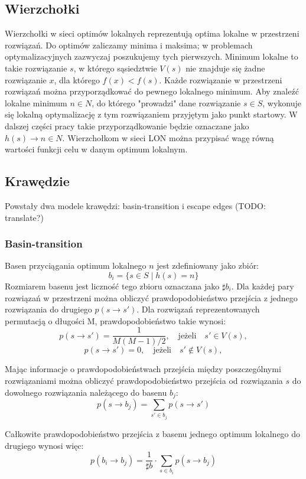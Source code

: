 \subsection*{Wierzchołki}
Wierzchołki w sieci optimów lokalnych reprezentują optima lokalne w przestrzeni rozwiązań.
Do optimów zaliczamy minima i maksima; w problemach optymalizacyjnych zazwyczaj poszukujemy tych pierwszych.
Minimum lokalne to takie rozwiązanie $s$, w którego sąsiedztwie $V(s)$ nie znajduje się żadne rozwiązanie $x$, dla którego $f(x) < f(s)$.
Każde rozwiązanie w przestrzeni rozwiązań można przyporządkować do pewnego lokalnego minimum.
Aby znaleźć lokalne minimum $n \in{N}$, do którego "prowadzi" dane rozwiązanie $s\in{S}$, wykonuje się lokalną optymalizację
z tym rozwiązaniem przyjętym jako punkt startowy.
W dalszej części pracy takie przyporządkowanie będzie oznaczane jako $h(s) \rightarrow n\in{N}$.
Wierzchołkom w sieci LON można przypisać wagę równą wartości funkcji celu w danym optimum lokalnym.

\subsection*{Krawędzie}

Powstały dwa modele krawędzi: basin-transition i escape edges (TODO: translate?)

\subsubsection{Basin-transition}
Basen przyciągania optimum lokalnego $n$ jest zdefiniowany jako zbiór:
$$b_i = \{s\in{S} \mid h(s) = n\}$$
Rozmiarem basenu jest liczność tego zbioru oznaczana jako $\sharp b_i$.
Dla każdej pary rozwiązań w przestrzeni można obliczyć prawdopodobieństwo przejścia z jednego rozwiązania do drugiego $p(s \rightarrow s')$.
Dla rozwiązań reprezentowanych permutacją o długości M, prawdopodobieństwo takie wynosi:
$$p(s \rightarrow s') = \frac{1}{M(M-1)/2}, \quad \text{jeżeli} \quad s'\in{V(s)},$$
$$p(s \rightarrow s') = 0, \quad \text{jeżeli} \quad s'\notin{V(s)},$$

Mając informacje o prawdopodobieństwach przejścia między poszczególnymi rozwiązaniami można obliczyć prawdopodobieństwo
przejścia od rozwiązania $s$ do dowolnego rozwiązania należącego do basenu $b_j$:
$$p(s \rightarrow b_j) = \sum_{s'\in{b_j}} p(s \rightarrow s')$$

Całkowite prawdopodobieństwo przejścia z basenu jednego optimum lokalnego do drugiego wynosi więc:
$$p(b_i \rightarrow b_j) = \frac{1}{\sharp b} \cdot \sum_{s\in{b_i}} p(s \rightarrow b_j)$$

